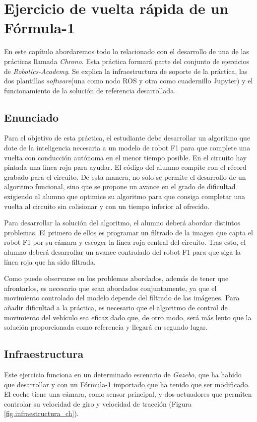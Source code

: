 \chapter{Ejercicio de vuelta rápida de un Fórmula-1}\label{cap.chrono}
En este capítulo abordaremos todo lo relacionado con el desarrollo de una de las prácticas llamada \textit{Chrono}. Esta práctica formará parte del conjunto de ejercicios de \textit{Robotics-Academy}. Se explica la infraestructura de soporte de la práctica, las dos plantillas \textit{software}(una como nodo ROS y otra como cuadernillo Jupyter) y el funcionamiento de la solución de referencia desarrollada.

\section{Enunciado}\label{sec.enunciado}
Para el objetivo de esta práctica, el estudiante debe desarrollar un algoritmo que dote de la inteligencia necesaria a un modelo de robot F1 para que complete una vuelta con conducción autónoma en el menor tiempo posible. En el circuito hay pintada una línea roja para ayudar. El código del alumno compite con el récord grabado para el circuito. De esta manera, no solo se permite el desarrollo de un algoritmo funcional, sino que se propone un avance en el grado de dificultad exigiendo al alumno que optimice su algoritmo para que consiga completar una vuelta al circuito sin colisionar y con un tiempo inferior al ofrecido.

Para desarrollar la solución del algoritmo, el alumno deberá abordar distintos problemas. El primero de ellos es programar un filtrado de la imagen que capta el robot F1 por su cámara y escoger la línea roja central del circuito. Tras esto, el alumno deberá desarrollar un avance controlado del robot F1 para que siga la línea roja que ha sido filtrada.

Como puede observarse en los problemas abordados, además de tener que afrontarlos, es necesario que sean abordados conjuntamente, ya que el movimiento controlado del modelo depende del filtrado de las imágenes. Para añadir dificultad a la práctica, es necesario que el algoritmo de control de movimiento del vehículo sea eficaz dado que, de otro modo, será más lento que la solución proporcionada como referencia y llegará en segundo lugar.

\section{Infraestructura}
Este ejercicio funciona en un determinado escenario de \textit{Gazebo}, que ha habido que desarrollar y con un Fórmula-1 importado que ha tenido que ser modificado. El coche tiene una cámara, como sensor principal, y dos actuadores que permiten controlar su velocidad de giro y velocidad de tracción (Figura \ref{fig.infraestructura_ch}).

